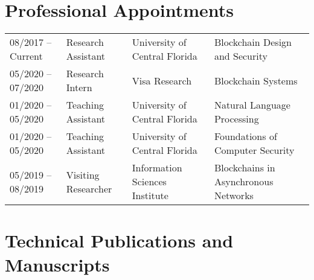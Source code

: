 \documentclass[10pt]{article}
\begin{document}
\section*{\sc Professional Appointments}

\begin{tabular}{llll}
     08/2017 -- Current & Research Assistant &  University of Central Florida & Blockchain Design and Security \\
    05/2020 -- 07/2020 & Research Intern &  Visa Research & Blockchain Systems \\
    01/2020 -- 05/2020 & Teaching Assistant &  University of Central Florida & Natural Language Processing \\
    01/2020 -- 05/2020 & Teaching Assistant &  University of Central Florida & Foundations of Computer Security \\
    05/2019 -- 08/2019 & Visiting Researcher &  Information Sciences Institute & Blockchains in Asynchronous Networks \\
     
\end{tabular}


\section*{\sc Technical Publications and Manuscripts}\label{publications}
\end{document}
